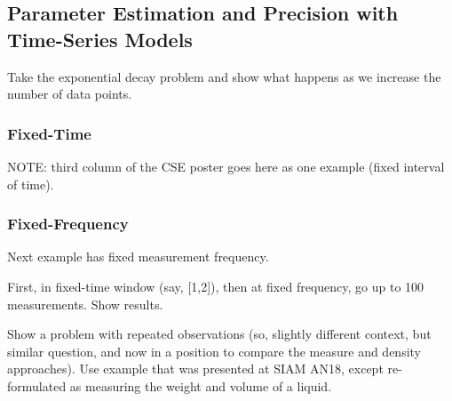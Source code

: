 \subsection{Parameter Estimation and Precision with Time-Series Models}
Take the exponential decay problem and show what happens as we increase the number of data points.

\subsubsection{Fixed-Time}
NOTE: third column of the CSE poster goes here as one example (fixed interval of time).

\subsubsection{Fixed-Frequency}
Next example has fixed measurement frequency.


First, in fixed-time window (say, [1,2]), then at fixed frequency, go up to 100 measurements. Show results.

Show a problem with repeated observations (so, slightly different context, but similar question, and now in a position to compare the measure and density approaches). Use example that was presented at SIAM AN18, except re-formulated as measuring the weight and volume of a liquid. 
